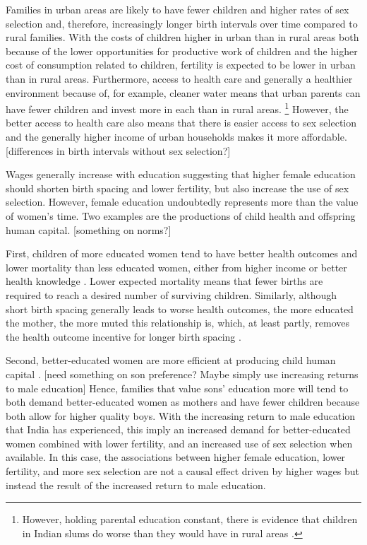 Families in urban areas are likely to have fewer children and higher rates of sex 
selection and, therefore, increasingly longer birth intervals over time compared to
rural families.
With the costs of children higher in urban than in rural areas both because of the
lower opportunities for productive work of children and the higher cost of consumption
related to children, fertility is expected to be lower in urban than in rural areas.
Furthermore, access to health care and generally a healthier environment because of,
for example, cleaner water means that urban parents can have fewer children and invest
more in each than in rural areas.%
\footnote{
However, holding parental education constant, there is evidence that children in
Indian slums do worse than they would have in rural areas \citep{Portner2018a}.
}
However, the better access to health care also means that there is easier access to
sex selection and the generally higher income of urban households makes it more
affordable.
[differences in birth intervals without sex selection?]


Wages generally increase with education suggesting that higher female education
should shorten birth spacing and lower fertility, but also increase the use of sex 
selection.
However, female education undoubtedly represents more than the value of women's time.
Two examples are the productions of child health and offspring human capital.
[something on norms?]

First, children of more educated women tend to have better health outcomes and lower 
mortality than less educated women, either from higher income or better health knowledge 
\citep{Rosenzweig1982a,Kovsted2002,Whitworth2002,Maitra2008}.
Lower expected mortality means that fewer births are required to reach a desired
number of surviving children.
Similarly, although short birth spacing generally leads to worse health outcomes, 
the more educated the mother, the more muted this relationship is, which, at least partly,
removes the health outcome incentive for longer birth spacing
\citep{Whitworth2002,Conde-Agudelo2012,Molitoris2019}.

Second, better-educated women are more efficient at producing child human capital 
\citep{Behrman1999}.
[need something on son preference? Maybe simply use increasing returns to male education]
Hence, families that value sons' education more will tend to both demand better-educated
women as mothers and have fewer children because both allow for higher quality boys.
With the increasing return to male education that India has experienced, this imply
an increased demand for better-educated women combined with lower fertility, and an 
increased use of sex selection when available.
In this case, the associations between higher female education, lower fertility, and more
sex selection are not a causal effect driven by higher wages but instead the result of the 
increased return to male education. 

